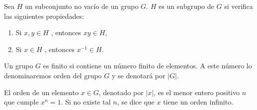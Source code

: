 \begin{definition}
	Sea $H$ un subconjunto no vacío de un grupo $G$. $H$ es un subgrupo de $G$  si verifica las siguientes propiedades:

\begin{enumerate}
	\item Si $x,y \in H$ , entonces $xy \in H$,
	\item Si $x \in H$ , entonces $x^{-1} \in H$.
\end{enumerate}
\end{definition}



\begin{definition}
Un grupo $G$ es finito si contiene un número finito de elementos. A este número lo denominaremos orden del grupo $G$ y se denotará por $|G|$.
\end{definition}


\begin{definition}
 El orden de un elemento $x\in G$, denotado por $|x|$, es el menor entero positivo $n$  que cumple $x^n = 1$. Si no existe tal $n$, se dice que $x$ tiene un orden infinito. 
\end{definition}







